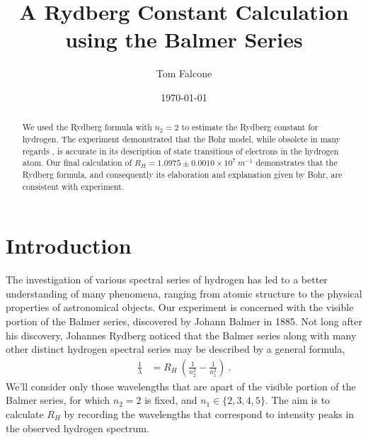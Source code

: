 \documentclass[aps,prl,preprint,groupedaddress]{revtex4-2}
\begin{document}
\title{A Rydberg Constant Calculation using the Balmer Series}
\author{Tom Falcone}
\date{\today}

\begin{abstract}
We used the Rydberg formula with $n_2 = 2$ to estimate the Rydberg constant for hydrogen. The experiment demonstrated that the Bohr model, while obsolete in many regards \cite{krane}, is accurate in its description of state transitions of electrons in the hydrogen atom. Our final calculation of 
$R_H = 1.0975 \pm 0.0010 \times 10^7 ~\si{m^{-1}}$
demonstrates that the Rydberg formula, and consequently its elaboration and explanation given by Bohr, are consistent with experiment.
\end{abstract}

\maketitle

\section{Introduction}
The investigation of various spectral series of hydrogen has led to a better understanding of many phenomena, ranging from atomic structure to the physical properties of astronomical objects. Our experiment is concerned with the visible portion of the Balmer series, discovered by Johann Balmer in 1885\cite{krane}. Not long after his discovery, Johannes Rydberg noticed that the Balmer series along with many other distinct hydrogen spectral series may be described by a general formula,
\begin{align}
    \frac{1}{\lambda}&=R_H~(\frac{1}{n_2^2}-\frac{1}{n_1^2})~.
\end{align}
We'll consider only those wavelengths that are apart of the visible portion of the Balmer series, for which $n_2=2$ is fixed, and $n_1 \in \{2,3,4,5\}$. The aim is to calculate $R_H$ by recording the wavelengths that correspond to intensity peaks in the observed hydrogen spectrum.
\end{document}
